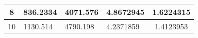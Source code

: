 \begin{table}
\begin{tabular}{|c|l|l|l|c|}
8                                                                                                                  & 836.2334                                                                                                                                                    & 4071.576                                                                                                                       & 4.8672945                              & 1.6224315           \\ \hline
10                                                                                                                 & 1130.514                                                                                                                                                    & 4790.198                                                                                                                       & 4.2371859                              & 1.4123953           \\ \hline
\end{tabular}
\end{table}


